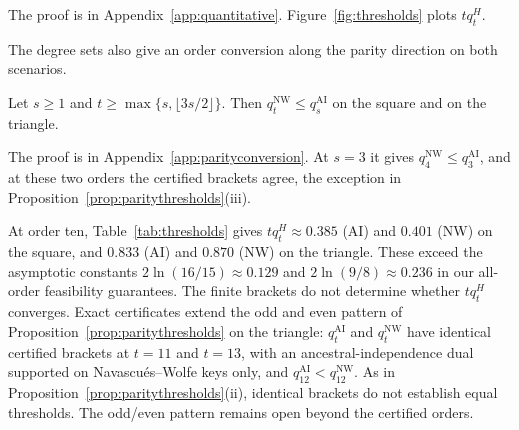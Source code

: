 The proof is in Appendix~\ref{app:quantitative}. Figure~\ref{fig:thresholds} plots $tq_t^H$.

The degree sets also give an order conversion along the parity direction on both scenarios.

\begin{proposition}\label{prop:parityconversion}
Let $s\ge1$ and $t\ge\max\{s,\lfloor3s/2\rfloor\}$. Then $q^{\mathrm{NW}}_t\le q^{\mathrm{AI}}_s$ on the square and on the triangle.
\end{proposition}

The proof is in Appendix~\ref{app:parityconversion}. At $s=3$ it gives $q^{\mathrm{NW}}_4\le q^{\mathrm{AI}}_3$, and at these two orders the certified brackets agree, the exception in Proposition~\ref{prop:paritythresholds}(iii).

At order ten, Table~\ref{tab:thresholds} gives $tq_t^H\approx0.385$ (AI) and $0.401$ (NW) on the square, and $0.833$ (AI) and $0.870$ (NW) on the triangle. These exceed the asymptotic constants $2\ln(16/15)\approx0.129$ and $2\ln(9/8)\approx0.236$ in our all-order feasibility guarantees. The finite brackets do not determine whether $tq_t^H$ converges. Exact certificates extend the odd and even pattern of Proposition~\ref{prop:paritythresholds} on the triangle: $q^{\mathrm{AI}}_t$ and $q^{\mathrm{NW}}_t$ have identical certified brackets at $t=11$ and $t=13$, with an ancestral-independence dual supported on Navascu\'es--Wolfe keys only, and $q^{\mathrm{AI}}_{12}<q^{\mathrm{NW}}_{12}$. As in Proposition~\ref{prop:paritythresholds}(ii), identical brackets do not establish equal thresholds. The odd/even pattern remains open beyond the certified orders.


